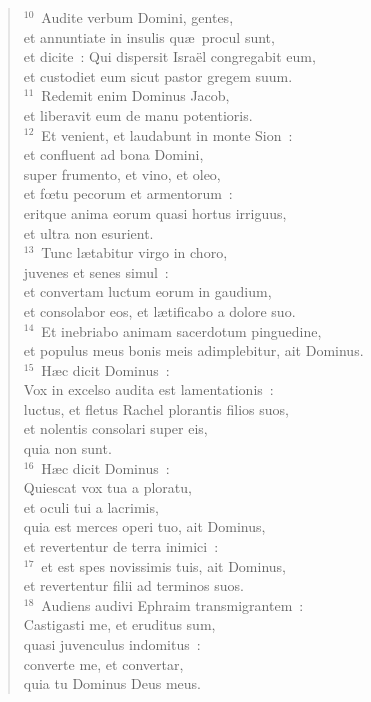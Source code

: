 \begin{verse}
${}^{10}$~Audite verbum Domini, gentes,\\ et annuntiate in insulis qu\ae\ procul sunt,\\ et dicite~: Qui dispersit Isra\"el congregabit eum,\\ et custodiet eum sicut pastor gregem suum.\\
${}^{11}$~Redemit enim Dominus Jacob,\\ et liberavit eum de manu potentioris.\\
${}^{12}$~Et venient, et laudabunt in monte Sion~:\\ et confluent ad bona Domini,\\ super frumento, et vino, et oleo,\\ et fœtu pecorum et armentorum~:\\ eritque anima eorum quasi hortus irriguus,\\ et ultra non esurient.\\
${}^{13}$~Tunc l\ae tabitur virgo in choro,\\ juvenes et senes simul~:\\ et convertam luctum eorum in gaudium,\\ et consolabor eos, et l\ae tificabo a dolore suo.\\
${}^{14}$~Et inebriabo animam sacerdotum pinguedine,\\ et populus meus bonis meis adimplebitur, ait Dominus.\\
${}^{15}$~H\ae c dicit Dominus~:\\ Vox in excelso audita est lamentationis~:\\ luctus, et fletus Rachel plorantis filios suos,\\ et nolentis consolari super eis,\\ quia non sunt.\\
${}^{16}$~H\ae c dicit Dominus~:\\ Quiescat vox tua a ploratu,\\ et oculi tui a lacrimis,\\ quia est merces operi tuo, ait Dominus,\\ et revertentur de terra inimici~:\\
${}^{17}$~et est spes novissimis tuis, ait Dominus,\\ et revertentur filii ad terminos suos.\\
${}^{18}$~Audiens audivi Ephraim transmigrantem~:\\ Castigasti me, et eruditus sum,\\ quasi juvenculus indomitus~:\\ converte me, et convertar,\\ quia tu Dominus Deus meus.\\

\end{verse}
